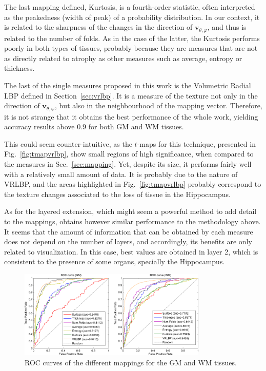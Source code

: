 The last mapping defined, Kurtosis, is a fourth-order statistic, often interpreted as the peakedness (width of peak) of a probability distribution. In our context, it is related to the sharpness of the changes in the direction of $\mathbf{v}_{\theta,\varphi}$, and thus is related to the number of folds. As in the case of the latter, the Kurtosis performs poorly in both types of tissues, probably because they are measures that are not as directly related to atrophy as other measures such as average, entropy or thickness. 

The last of the single measures proposed in this work is the Volumetric Radial LBP defined in Section~\ref{sec:vrlbp}. It is a measure of the texture not only in the direction of $\mathbf{v}_{\theta,\varphi}$, but also in the neighbourhood of the mapping vector. Therefore, it is not strange that it obtains the best performance of the whole work, yielding accuracy results above $0.9$ for both \ac{GM} and \ac{WM} tissues. 

This could seem counter-intuitive, as the $t$-maps for this technique, presented in Fig.~\ref{fig:tmapvrlbp}, show small regions of high significance, when compared to the measures in Sec.~\ref{sec:mapping}. Yet, despite its size, it performs fairly well with a relatively small amount of data. It is probably due to the nature of VRLBP, and the areas highlighted in Fig.~\ref{fig:tmapvrlbp} probably correspond to the texture changes associated to the loss of tissue in the Hippocampus. 

As for the layered extension, which might seem a powerful method to add detail to the mappings, obtains however similar performance to the methodology above. It seems that the amount of information that can be obtained by each measure does not depend on the number of layers, and accordingly, its benefits are only related to visualization. In this case, best values are obtained in layer 2, which is consistent to the presence of some organs, specially the Hippocampus.  

\begin{figure}[htp]%
	\centering
	\includegraphics[width=0.8\textwidth]{Graphics/ch6/13-ROC}
	
	\caption{ROC curves of the different mappings for the \ac{GM} and \ac{WM} tissues.}
	\label{fig:roc}
\end{figure}

